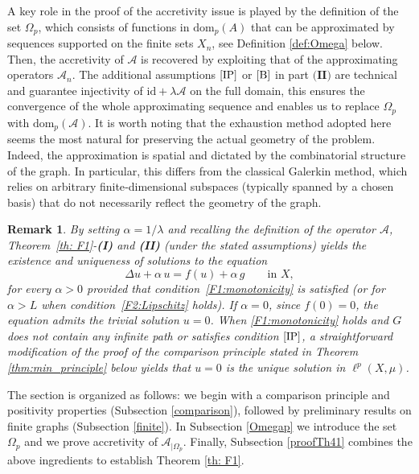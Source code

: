 \documentclass[journal]{article}
\theoremstyle{nonitalic}
\theoremstyle{nonitalic}
\newtheorem{remark}[theorem]{Remark}
\theoremstyle{plain} %
\numberwithin{equation}{section}
\begin{document}
A key role in the proof of the accretivity issue is played by the definition of the set $\Omega_p$, which consists of functions in $\text{dom}_p(A)$ that can be approximated by sequences supported on the finite sets $X_n$, see Definition \ref{def:Omega} below. Then, the accretivity of $\mathcal{A}$ is recovered by exploiting that of the approximating operators $\mathcal{A}_n$. The additional assumptions $\textnormal{\ref{IP}}$ or $\textnormal{\ref{B}}$ in part $\textbf{(II)}$ are technical and guarantee injectivity of $\text{id}+\lambda \mathcal{A}$ on the full domain, this ensures the convergence of the whole approximating sequence and enables us to replace $\Omega_p$ with $\text{dom}_p(\mathcal{A})$. It is worth noting that the exhaustion method adopted here seems the most natural for preserving the actual geometry of the problem. Indeed, the approximation is spatial and dictated by the combinatorial structure of the graph. In particular, this differs from the classical Galerkin method, which relies on arbitrary finite‑dimensional subspaces (typically spanned by a chosen basis) that do not necessarily reflect the geometry of the graph.

\begin{remark}\label{staz} By setting $\alpha = 1/\lambda$ and recalling the definition of the operator 
$\mathcal{A}$, Theorem~\ref{th: F1}-\textnormal{\textbf{(I)}} and \textnormal{\textbf{(II)}} (under the stated assumptions) yields the 
existence and uniqueness of solutions to the equation
\begin{equation*}
  \Delta u + \alpha\, u = f(u) + \alpha\, g
  \qquad \text{in } X,
\end{equation*}
for every $\alpha>0$ provided that condition~\textnormal{\ref{F1:monotonicity}} 
is satisfied (or for $\alpha > L$ when condition~\textnormal{\ref{F2:Lipschitz}} 
holds). If $\alpha = 0$, since $f(0)=0$, the equation admits the trivial 
solution $u=0$. When \textnormal{\ref{F1:monotonicity}} holds and $G$ does not contain any infinite path or satisfies condition $\textnormal{\ref{IP}}$, a straightforward modification of the proof of the comparison principle stated in Theorem \ref{thm:min_principle} below yields that $u=0$ is the unique solution in $\ell^p(X,\mu)$.
\end{remark}


The section is organized as follows: we begin with a comparison principle and positivity properties (Subsection \ref{comparison}), followed by preliminary results on finite graphs (Subsection \ref{finite}). In Subsection \ref{Omegap} we introduce the set $\Omega_p$ and we prove accretivity of $\mathcal{\mathcal A}_{|\Omega_p}$. Finally, Subsection \ref{proofTh41} combines the above ingredients to establish Theorem \ref{th: F1}.
\end{document}
